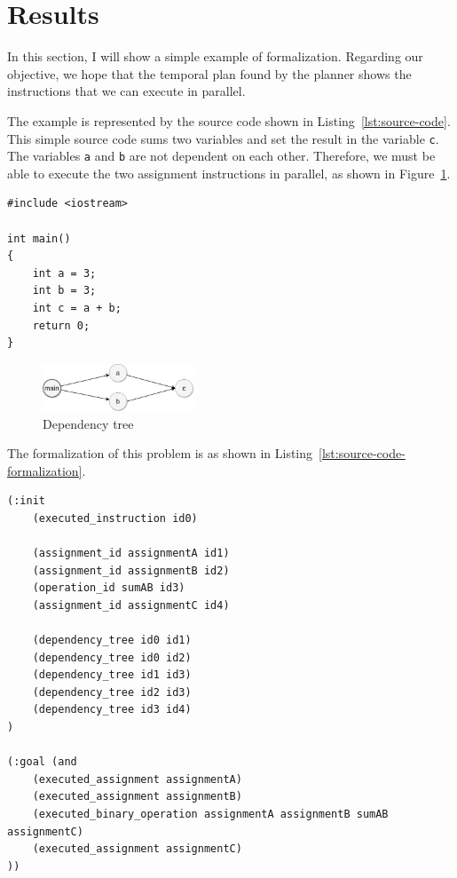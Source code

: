 \documentclass[letterpaper]{article}
\begin{document}
\section{Results}

In this section, I will show a simple example of formalization. Regarding our objective, we hope that the temporal plan found by the planner shows the instructions that we can execute in parallel.

The example is represented by the source code shown in Listing~\ref{lst:source-code}. This simple source code sums two variables and set the result in the variable \texttt{c}. The variables \texttt{a} and \texttt{b} are not dependent on each other. Therefore, we must be able to execute the two assignment instructions in parallel, as shown in Figure~\ref{fig:dependency-tree-parallel}.

\begin{lstlisting}[caption=Source code,label=lst:source-code,style=cppStyle]
#include <iostream>

int main()
{
    int a = 3;
    int b = 3;
    int c = a + b;
    return 0;
}
\end{lstlisting}

\begin{figure}[h]
    \centering
    \includegraphics[width=0.4\textwidth]{./images/dependency-tree-Parallel.png}
    \caption{Dependency tree}
    \label{fig:dependency-tree-parallel}
\end{figure}

The formalization of this problem is as shown in Listing~\ref{lst:source-code-formalization}.

\begin{lstlisting}[caption=Source code formalization,label=lst:source-code-formalization,style=pddlStyle]
(:init
    (executed_instruction id0)

    (assignment_id assignmentA id1)
    (assignment_id assignmentB id2)
    (operation_id sumAB id3)
    (assignment_id assignmentC id4)
    
    (dependency_tree id0 id1)
    (dependency_tree id0 id2)
    (dependency_tree id1 id3)
    (dependency_tree id2 id3)
    (dependency_tree id3 id4)
)

(:goal (and
    (executed_assignment assignmentA)
    (executed_assignment assignmentB)
    (executed_binary_operation assignmentA assignmentB sumAB assignmentC)
    (executed_assignment assignmentC)
))
\end{lstlisting}
\end{document}

